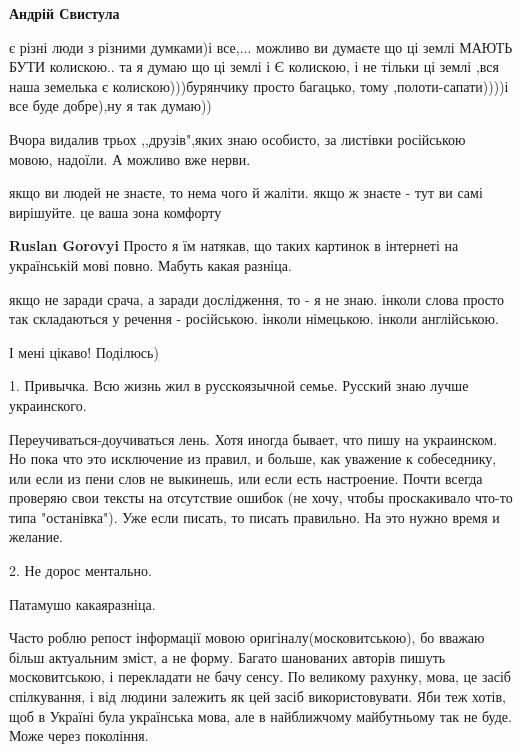 \begin{itemize}
\begin{itemize}
\textbf{Андрій Свистула} 

є різні люди з різними думками)і все,... можливо ви думаєте що ці землі МАЮТЬ
БУТИ колискою.. та я думаю що ці землі і Є колискою, і не тільки ці землі ,вся
наша земелька є колискою)))бурянчику просто багацько, тому ,полоти-сапати))))і
все буде добре),ну я так думаю))

\end{itemize} %

Вчора видалив трьох ,,друзів",яких знаю особисто, за листівки російською мовою, надоїли.
А можливо вже нерви.

\begin{itemize} %
якщо ви людей не знаєте, то нема чого й жаліти. якщо ж знаєте - тут ви самі вирішуйте. це ваша зона комфорту

\textbf{Ruslan Gorovyi} Просто я їм натякав, що таких картинок в інтернеті на українській мові повно. Мабуть какая разніца.
\end{itemize} %


якщо не заради срача, а заради дослідження, то - я не знаю. інколи слова просто
так складаються у речення - російською. інколи німецькою. інколи англійською.

І мені цікаво!
Поділюсь)


1. Привычка. Всю жизнь жил в русскоязычной семье. Русский знаю лучше
украинского.\par Переучиваться-доучиваться лень. Хотя иногда бывает, что пишу на
украинском. Но пока что это исключение из правил, и больше, как уважение к
собеседнику, или если из пени слов не выкинешь, или если есть настроение. Почти
всегда проверяю свои тексты на отсутствие ошибок (не хочу, чтобы проскакивало
что-то типа "останівка"). Уже если писать, то писать правильно. На это нужно
время и желание.

2. Не дорос ментально.


Патамушо какаяразніца.


Часто роблю репост інформації мовою оригіналу(московитською), бо вважаю більш
актуальним зміст, а не форму. Багато шанованих авторів пишуть московитською, і
перекладати не бачу сенсу. По великому рахунку, мова, це засіб спілкування, і
від людини залежить як цей засіб використовувати. Яби теж хотів, щоб в Україні
була українська мова, але в найближчому майбутньому так не буде. Може через
покоління.

\end{itemize} %
